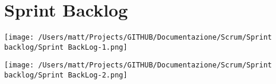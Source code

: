 \chapter{Sprint Backlog}

\texttt{[image: /Users/matt/Projects/GITHUB/Documentazione/Scrum/Sprint backlog/Sprint BackLog-1.png]}

\texttt{[image: /Users/matt/Projects/GITHUB/Documentazione/Scrum/Sprint backlog/Sprint BackLog-2.png]}

